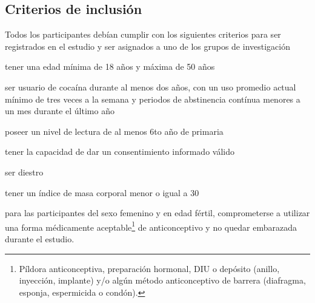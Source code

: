 \subsection{Criterios de inclusión}
Todos los participantes debían cumplir con los siguientes criterios para ser registrados en el estudio y ser asignados a uno de los grupos de investigación
\begin{enumerate*}[label=\emph{\alph*}), before=\unskip{: }, itemjoin={{; }}, itemjoin*={{, y }}]
    \item tener una edad mínima de 18 años y máxima de 50 años
    \item ser usuario de cocaína durante al menos dos  años, con un uso promedio actual mínimo de tres veces a la semana y periodos de abstinencia contínua menores a un mes durante el último año
    \item poseer un nivel de lectura de al menos 6to año de primaria
    \item tener la capacidad de dar un consentimiento informado válido
    \item ser diestro
    \item tener un índice de masa corporal menor o igual a 30
    \item para las participantes del sexo femenino y en edad fértil, comprometerse a utilizar una forma médicamente aceptable\footnote{Píldora anticonceptiva, preparación hormonal, DIU o depósito (anillo, inyección, implante) y/o algún método anticonceptivo de barrera (diafragma, esponja, espermicida o condón).} de anticonceptivo y no quedar embarazada durante el estudio.
\end{enumerate*}

